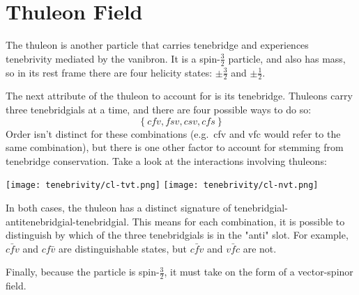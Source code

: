 \section{Thuleon Field}

The thuleon is another particle that carries tenebridge and experiences tenebrivity mediated by the vanibron. It is a spin-\(\frac{3}{2}\) particle, and also has mass, so in its rest frame there are four helicity states: \(\pm\frac{3}{2}\) and \(\pm\frac{1}{2}\).

The next attribute of the thuleon to account for is its tenebridge. Thuleons carry three tenebridgials at a time, and there are four possible ways to do so:
\[\left\{cfv,fsv,csv,cfs\right\}\]
Order isn't distinct for these combinations (e.g.\ cfv and vfc would refer to the same combination), but there is one other factor to account for stemming from tenebridge conservation. Take a look at the interactions involving thuleons:
\begin{center}
  \texttt{[image: tenebrivity/cl-tvt.png]}
  \texttt{[image: tenebrivity/cl-nvt.png]}
\end{center}

In both cases, the thuleon has a distinct signature of tenebridgial-antitenebridgial-tenebridgial. This means for each combination, it is possible to distinguish by which of the three tenebridgials is in the "anti" slot. For example, \(c\bar{f}v\) and \(cf\bar{v}\) are distinguishable states, but \(c\bar{f}v\) and \(v\bar{f}c\) are not.

Finally, because the particle is spin-\(\frac{3}{2}\), it must take on the form of a vector-spinor field.

